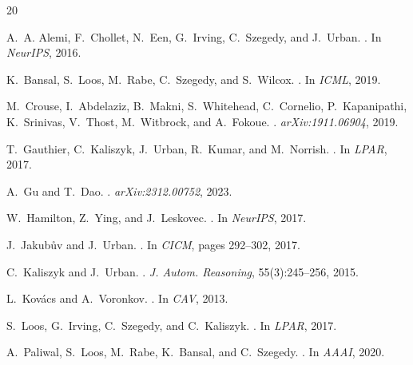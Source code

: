 \documentclass{article}
\begin{document}
\begin{thebibliography}{20}

A.~A. Alemi, F.~Chollet, N.~Een, G.~Irving, C.~Szegedy, and J.~Urban.
.
\newblock In \emph{NeurIPS}, 2016.

K.~Bansal, S.~Loos, M.~Rabe, C.~Szegedy, and S.~Wilcox.
.
\newblock In \emph{ICML}, 2019.

M.~Crouse, I.~Abdelaziz, B.~Makni, S.~Whitehead, C.~Cornelio, P.~Kapanipathi, K.~Srinivas, V.~Thost, M.~Witbrock, and A.~Fokoue.
.
\newblock \emph{arXiv:1911.06904}, 2019.

T.~Gauthier, C.~Kaliszyk, J.~Urban, R.~Kumar, and M.~Norrish.
.
\newblock In \emph{LPAR}, 2017.

A.~Gu and T.~Dao.
.
\newblock \emph{arXiv:2312.00752}, 2023.

W.~Hamilton, Z.~Ying, and J.~Leskovec.
.
\newblock In \emph{NeurIPS}, 2017.

J.~Jakub\r{u}v and J.~Urban.
.
\newblock In \emph{CICM}, pages 292--302, 2017.

C.~Kaliszyk and J.~Urban.
.
\newblock \emph{J. Autom. Reasoning}, 55(3):245--256, 2015.

L.~Kov{\'a}cs and A.~Voronkov.
.
\newblock In \emph{CAV}, 2013.

S.~Loos, G.~Irving, C.~Szegedy, and C.~Kaliszyk.
.
\newblock In \emph{LPAR}, 2017.

A.~Paliwal, S.~Loos, M.~Rabe, K.~Bansal, and C.~Szegedy.
.
\newblock In \emph{AAAI}, 2020.


\end{thebibliography}
\end{document}
